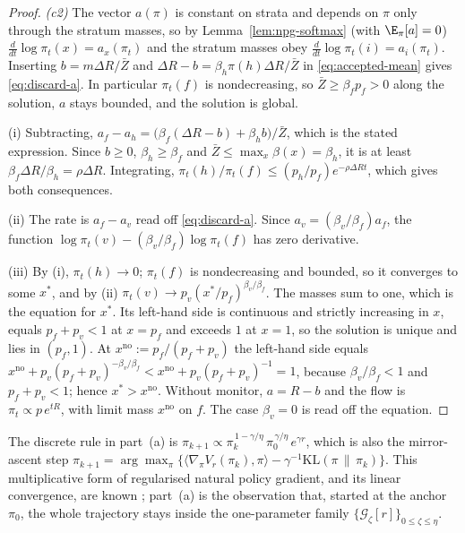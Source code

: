 \begin{proof}
\emph{(c2)} The vector $a(\pi)$ is constant on strata and depends on $\pi$
only through the stratum masses, so by Lemma~\ref{lem:npg-softmax}
(with $\E_\pi[a]=0$) $\frac{d}{dt}\log\pi_t(x)=a_x(\pi_t)$ and the stratum
masses obey $\frac{d}{dt}\log\pi_t(i)=a_i(\pi_t)$. Inserting
$b=m\Delta R/\bar Z$ and $\Delta R-b=\beta_h\pi(h)\Delta R/\bar Z$ in
\eqref{eq:accepted-mean} gives \eqref{eq:discard-a}. In particular
$\pi_t(f)$ is nondecreasing, so $\bar Z\ge\beta_fp_f>0$ along the solution,
$a$ stays bounded, and the solution is global.

(i) Subtracting, $a_f-a_h=\bigl(\beta_f(\Delta R-b)+\beta_hb\bigr)/\bar Z$,
which is the stated expression. Since $b\ge0$, $\beta_h\ge\beta_f$ and
$\bar Z\le\max_x\beta(x)=\beta_h$, it is at least
$\beta_f\Delta R/\beta_h=\rho\Delta R$. Integrating,
$\pi_t(h)/\pi_t(f)\le(p_h/p_f)e^{-\rho\Delta Rt}$, which gives both
consequences.

(ii) The rate is $a_f-a_v$ read off \eqref{eq:discard-a}. Since
$a_v=(\beta_v/\beta_f)a_f$, the function
$\log\pi_t(v)-(\beta_v/\beta_f)\log\pi_t(f)$ has zero derivative.

(iii) By (i), $\pi_t(h)\to0$; $\pi_t(f)$ is nondecreasing and bounded, so it
converges to some $x^\ast$, and by (ii) $\pi_t(v)\to p_v(x^\ast/p_f)^{\beta_v/\beta_f}$.
The masses sum to one, which is the equation for $x^\ast$. Its left-hand
side is continuous and strictly increasing in $x$, equals $p_f+p_v<1$ at
$x=p_f$ and exceeds $1$ at $x=1$, so the solution is unique and lies in
$(p_f,1)$. At $x^{\mathrm{no}}:=p_f/(p_f+p_v)$ the left-hand side equals
$x^{\mathrm{no}}+p_v(p_f+p_v)^{-\beta_v/\beta_f}<x^{\mathrm{no}}+p_v(p_f+p_v)^{-1}=1$,
because $\beta_v/\beta_f<1$ and $p_f+p_v<1$; hence
$x^\ast>x^{\mathrm{no}}$. Without monitor, $a=R-b$ and the flow is
$\pi_t\propto p\,e^{tR}$, with limit mass $x^{\mathrm{no}}$ on $f$. The case $\beta_v=0$ is read off the equation.
\end{proof}

\begin{remark}\label{rem:mirror}
The discrete rule in part~(a) is
$\pi_{k+1}\propto\pi_k^{\,1-\gamma/\eta}\,\pi_0^{\,\gamma/\eta}\,e^{\gamma r}$,
which is also the mirror-ascent step
$\pi_{k+1}=\arg\max_\pi\{\langle\nabla_\pi V_r(\pi_k),\pi\rangle-\gamma^{-1}\mathrm{KL}(\pi\,\|\,\pi_k)\}$.
This multiplicative form of regularised natural policy gradient, and its
linear convergence, are known \cite{cen2022fast}; part~(a) is the
observation that, started at the anchor $\pi_0$, the whole trajectory stays
inside the one-parameter family
$\{\mathcal G_\zeta[r]\}_{0\le\zeta\le\eta}$.
\end{remark}


